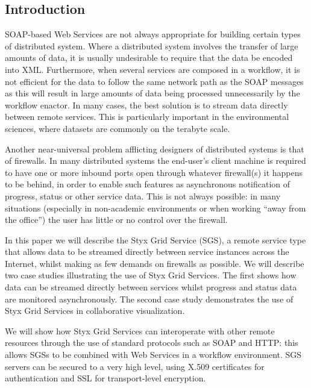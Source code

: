 \documentclass[a4paper]{article}
\begin{document}
\begin{multicols}{2}

\section{Introduction}
SOAP-based Web Services are not always appropriate for building certain types of distributed system.  Where a distributed system involves the transfer of large amounts of data, it is usually undesirable to require that the data be encoded into XML.  Furthermore, when several services are composed in a workflow, it is not efficient for the data to follow the same network path as the SOAP messages as this will result in large amounts of data being processed unnecessarily by the workflow enactor.  In many cases, the best solution is to stream data directly between remote services.  This is particularly important in the environmental sciences, where datasets are commonly on the terabyte scale.

Another near-universal problem afflicting designers of distributed systems is that of firewalls.  In many distributed systems the end-user's client machine is required to have one or more inbound ports open through whatever firewall(s) it happens to be behind, in order to enable such features as asynchronous notification of progress, status or other service data.  This is not always possible: in many situations (especially in non-academic environments or when working ``away from the office'') the user has little or no control over the firewall.

In this paper we will describe the Styx Grid Service (SGS), a remote service type that allows data to be streamed directly between service instances across the Internet, whilst making as few demands on firewalls as possible.  We will describe two case studies illustrating the use of Styx Grid Services.  The first shows how data can be streamed directly between services whilst progress and status data are monitored asynchronously.  The second case study demonstrates the use of Styx Grid Services in collaborative visualization.

We will show how Styx Grid Services can interoperate with other remote resources through the use of standard protocols such as SOAP and HTTP: this allows SGSs to be combined with Web Services in a workflow environment.  SGS servers can be secured to a very high level, using X.509 certificates for authentication and SSL for transport-level encryption.



\end{multicols}
\end{document}
